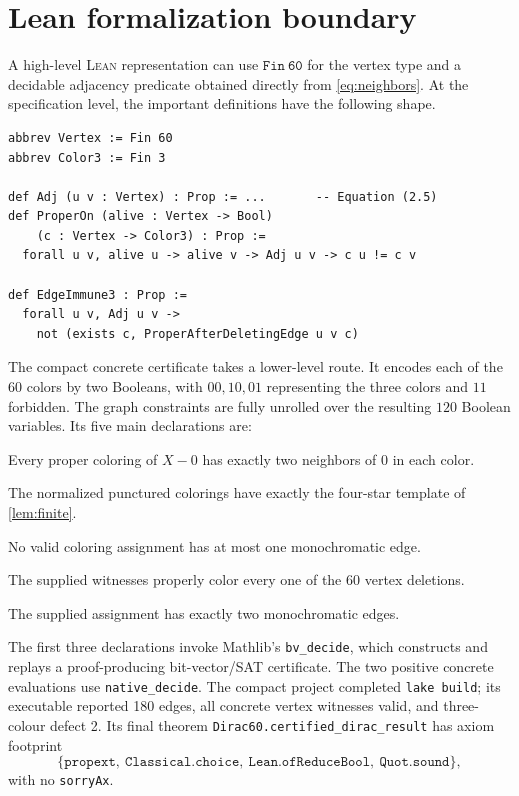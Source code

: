 \documentclass[10pt]{amsart}
\newcommand{\lean}{\textsc{Lean}}
\theoremstyle{definition}
\begin{document}
\section{Lean formalization boundary}\label{sec:lean}

A high-level \lean{} representation \cite{Lean4} can use
$\mathtt{Fin\ 60}$ for the vertex
type and a decidable adjacency predicate obtained directly from
\eqref{eq:neighbors}.  At the specification level, the important definitions
have the following shape.

\begin{lstlisting}[language={}]
abbrev Vertex := Fin 60
abbrev Color3 := Fin 3

def Adj (u v : Vertex) : Prop := ...       -- Equation (2.5)
def ProperOn (alive : Vertex -> Bool)
    (c : Vertex -> Color3) : Prop :=
  forall u v, alive u -> alive v -> Adj u v -> c u != c v

def EdgeImmune3 : Prop :=
  forall u v, Adj u v ->
    not (exists c, ProperAfterDeletingEdge u v c)
\end{lstlisting}

The compact concrete certificate takes a lower-level route.  It
encodes each of the $60$ colors by two Booleans, with $00,10,01$ representing
the three colors and $11$ forbidden.  The graph constraints are fully unrolled
over the resulting $120$ Boolean variables.  Its five main declarations are:
\begin{description}[style=nextline,itemsep=2pt,topsep=4pt]
\item[\normalfont\texttt{puncture\_balance\_universal}]
Every proper coloring of $X-0$ has exactly two neighbors of $0$ in each color.
\item[\normalfont\texttt{normalized\_puncture\_classifier}]
The normalized punctured colorings have exactly the four-star template of
\cref{lem:finite}.
\item[\normalfont\texttt{q3\_ge\_two\_encoded}]
No valid coloring assignment has at most one monochromatic edge.
\item[\normalfont\texttt{all\_vertex\_deletion\_witnesses}]
The supplied witnesses properly color every one of the $60$ vertex deletions.
\item[\normalfont\texttt{q3\_le\_two\_witness}]
The supplied assignment has exactly two monochromatic edges.
\end{description}
The first three declarations invoke Mathlib's \texttt{bv\_decide}, which
constructs and replays a proof-producing bit-vector/SAT certificate. The two
positive concrete evaluations use \texttt{native\_decide}. The compact project
completed \texttt{lake build}; its executable reported 180 edges, all concrete
vertex witnesses valid, and three-colour defect 2. Its final theorem
\texttt{Dirac60.certified\_dirac\_result} has axiom footprint
\[
 \{\texttt{propext},\ \texttt{Classical.choice},\
   \texttt{Lean.ofReduceBool},\ \texttt{Quot.sound}\},
\]
with no \texttt{sorryAx}.
\end{document}
